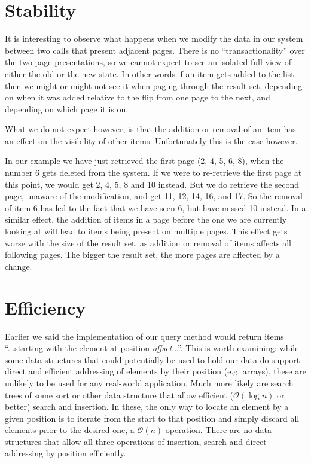 \documentclass[11pt,a4paper]{article}
\begin{document}
\begin{multicols*}{2}
\section*{Stability}
It is interesting to observe what happens when we modify the data in our system
between two calls that present adjacent pages. There is no ``transactionality''
over the two page presentations, so we cannot expect to see an isolated full
view of either the old or the new state. In other words if an item gets added to
the list then we might or might not see it when paging through the result set,
depending on when it was added relative to the flip from one page to the next,
and depending on which page it is on. 

What we do not expect however, is that the addition or removal of an item has an
effect on the visibility of other items. Unfortunately this is the case however. 

In our example we have just retrieved the first page (2, 4, 5, 6, 8), when the
number 6 gets deleted from the system. If we were to re-retrieve the first page
at this point, we would get 2, 4, 5, 8 and 10 instead. But we do retrieve the
second page, unaware of the modification, and get 11, 12, 14, 16, and 17. So the
removal of item 6 has led to the fact that we have seen 6, but have
missed 10 instead. In a similar effect, the addition of items in a page before
the one we are currently looking at will lead to items being present on multiple
pages. This effect gets worse with the size of the result set, as addition or
removal of items affects all following pages. The bigger the result set, the
more pages are affected by a change.

\section*{Efficiency}
Earlier we said the implementation of our query method would return items 
``...starting with the element at position {\em offset}...''. This is worth
examining: while some data structures that could potentially be used to hold our
data do support direct and efficient addressing of elements by their position
(e.g. arrays), these are unlikely to be used for any real-world application.
Much more likely are search trees of some sort or other data structure that 
allow efficient ($\mathcal{O}(\log{}n)$ or better) search and insertion. In 
these, the only way to locate an element by a
given position is to iterate from the start to that position and simply discard
all elements prior to the desired one, a $\mathcal{O}(n)$ operation. There are
no data structures that allow all three operations of insertion, search and
direct addressing by position efficiently. 


\end{multicols*}
\end{document}
